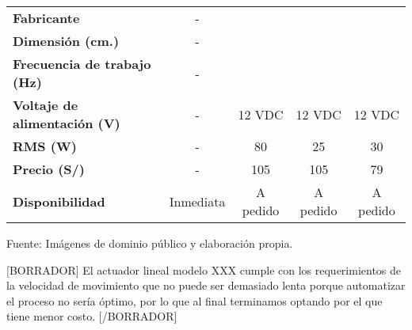\begin{itemize}
\begin{mytable}[H]
\begin{tabular}{l|c|c|c|c|}
\begin{minipage}{\mythirdmaxsizeofcontenttable}
			\end{minipage}  \\ \hline
			\multicolumn{1}{|l|}{\textbf{Fabricante}}              & -                                                                     &                 &             &                    \\ \hline
			\multicolumn{1}{|l|}{\textbf{Dimensión (cm.)}}         & -                                                                     &                 &             &                    \\ \hline
			\multicolumn{1}{|l|}{				
				\begin{minipage}{\myforthmaxsizeofcontenttable}	
					\textbf{Frecuencia de trabajo (Hz)}
				\end{minipage}
			}   & -                                                                     &                 &             &                    \\ \hline
			\multicolumn{1}{|l|}{
				\begin{minipage}{\myforthmaxsizeofcontenttable}	
					\textbf{Voltaje de alimentación (V)}
				\end{minipage}
			} & -                                                                     & 12 VDC          & 12 VDC      & 12 VDC             \\ \hline
			\multicolumn{1}{|l|}{\textbf{RMS (W)}}                 & -                                                                     & 80              & 25          & 30                 \\ \hline
			\multicolumn{1}{|l|}{\textbf{Precio (S/)}}             & -                                                                     & 105             & 105         & 79                 \\ \hline
			\multicolumn{1}{|l|}{\textbf{Disponibilidad}}          & Inmediata                                                             & A pedido        & A pedido    & A pedido           \\ \hline
		\end{tabular}
		\begin{flushleft}	
			Fuente: Imágenes de dominio público y elaboración propia.
		\end{flushleft}
	\end{mytable}

	[BORRADOR] El actuador lineal modelo XXX cumple con los requerimientos de la velocidad de movimiento que no puede ser demasiado lenta porque automatizar el proceso no sería óptimo, por lo que al final terminamos optando por el que tiene menor costo. [/BORRADOR]
	
\end{itemize}



